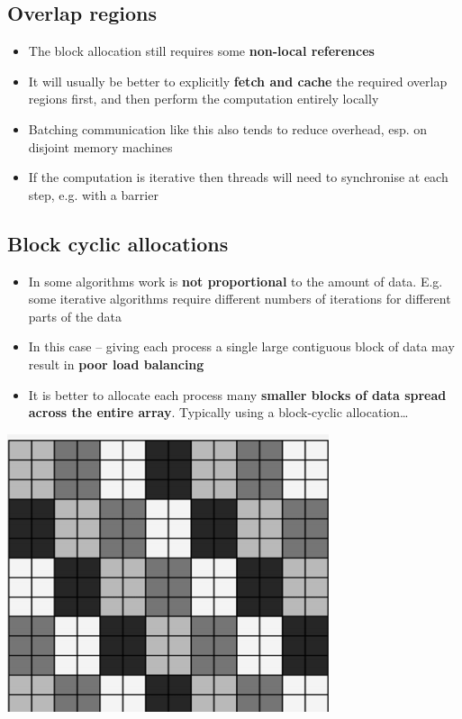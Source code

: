 \documentclass{article}
\begin{document}
\subsection{Overlap regions}
\begin{itemize}
  \item The block allocation still requires some \textbf{non-local references} 
  \item It will usually be better to explicitly \textbf{fetch and cache} the required overlap regions first, and then perform the computation entirely locally 
  \item Batching communication like this also tends to reduce overhead, esp. on disjoint memory machines 
  \item If the computation is iterative then threads will need to synchronise at each step, e.g. with a barrier
\end{itemize}

\subsection{Block cyclic allocations}
\begin{itemize}
  \item In some algorithms work is \textbf{not proportional} to the amount of data. E.g. some iterative algorithms require different numbers of iterations for different parts of the data
  \item In this case – giving each process a single large contiguous block of data may result in \textbf{poor load balancing}
  \item It is better to allocate each process many \textbf{smaller blocks of data spread across the entire array}. Typically using a block-cyclic allocation…
\end{itemize}

\begin{center}
  \includegraphics[scale=0.5]{block_alloc.png}
\end{center}
\end{document}
